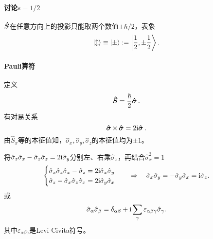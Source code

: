 \paragraph*{讨论$s=1/2$}$\bm{\hat S}\!\mathop{}$在任意方向上的投影只能取两个数值$\pm\hbar/2$，表象 
\[
	\left\vert \updownarrow\right\rangle\equiv\left\vert \pm\right\rangle:=\left\vert \frac12,\pm\frac12\right\rangle.
\]
\paragraph*{Pauli算符}定义 
\[
	\bm{\hat S}\!\mathop{}=\frac\hbar{2}\bm{\hat \sigma}\!\mathop{}.
\]
有对易关系
\[
	\bm{\hat \sigma}\!\mathop{}\times\,\bm{\hat \sigma}\!\mathop{}=2\mathrm{i}\bm{\hat \sigma}\!\mathop{}.
\]
由$\hat S_x$等的本征值知，$\hat\sigma_x,\hat\sigma_y,\hat\sigma_z$的本征值均为$\pm 1$。

将$\hat\sigma_z\hat\sigma_x-\hat\sigma_x\hat\sigma_z=2\mathrm{i}\hat\sigma_y$分别左、右乘$\hat\sigma_x$，再结合$\hat\sigma_x^2=1$
\begin{align}
	\begin{cases}
		\hat\sigma_x\hat\sigma_z\hat\sigma_x-\hat\sigma_z=2\mathrm{i}\hat\sigma_x\hat\sigma_y\\
		\hat\sigma_z-\hat\sigma_x\hat\sigma_z\hat\sigma_x=2\mathrm{i}\hat\sigma_y\hat\sigma_x
	\end{cases}\quad\Rightarrow\quad\hat\sigma_x\hat\sigma_y=-\hat\sigma_y\hat\sigma_x=\mathrm{i}\hat\sigma_z.
\end{align}
或
\begin{align}
	\hat\sigma_\alpha\hat\sigma_\beta=\delta_{\alpha\beta}+\mathrm{i}\sum_\gamma\varepsilon_{\alpha\beta\gamma}\hat\sigma_\gamma.
\end{align}
其中$\varepsilon_{\alpha\beta\gamma}$是Levi-Civita符号。
